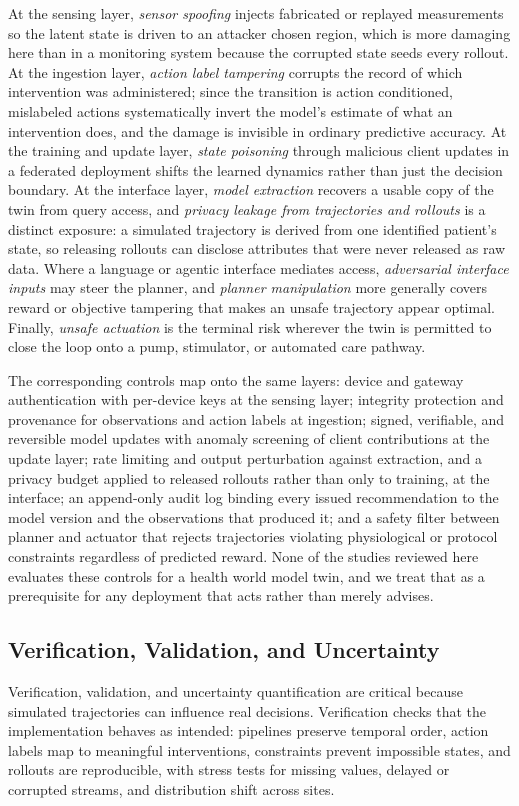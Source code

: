 \documentclass[journal]{IEEEtran}
\begin{document}
At the sensing layer, \emph{sensor spoofing} injects fabricated or replayed measurements so the latent state is driven to an attacker chosen region, which is more damaging here than in a monitoring system because the corrupted state seeds every rollout. At the ingestion layer, \emph{action label tampering} corrupts the record of which intervention was administered; since the transition is action conditioned, mislabeled actions systematically invert the model's estimate of what an intervention does, and the damage is invisible in ordinary predictive accuracy. At the training and update layer, \emph{state poisoning} through malicious client updates in a federated deployment shifts the learned dynamics rather than just the decision boundary. At the interface layer, \emph{model extraction} recovers a usable copy of the twin from query access, and \emph{privacy leakage from trajectories and rollouts} is a distinct exposure: a simulated trajectory is derived from one identified patient's state, so releasing rollouts can disclose attributes that were never released as raw data. Where a language or agentic interface mediates access, \emph{adversarial interface inputs} may steer the planner, and \emph{planner manipulation} more generally covers reward or objective tampering that makes an unsafe trajectory appear optimal. Finally, \emph{unsafe actuation} is the terminal risk wherever the twin is permitted to close the loop onto a pump, stimulator, or automated care pathway.

The corresponding controls map onto the same layers: device and gateway authentication with per-device keys at the sensing layer; integrity protection and provenance for observations and action labels at ingestion; signed, verifiable, and reversible model updates with anomaly screening of client contributions at the update layer; rate limiting and output perturbation against extraction, and a privacy budget applied to released rollouts rather than only to training, at the interface; an append-only audit log binding every issued recommendation to the model version and the observations that produced it; and a safety filter between planner and actuator that rejects trajectories violating physiological or protocol constraints regardless of predicted reward. None of the studies reviewed here evaluates these controls for a health world model twin, and we treat that as a prerequisite for any deployment that acts rather than merely advises.

\subsection{Verification, Validation, and Uncertainty}
Verification, validation, and uncertainty quantification are critical because simulated trajectories can influence real decisions. Verification checks that the implementation behaves as intended: pipelines preserve temporal order, action labels map to meaningful interventions, constraints prevent impossible states, and rollouts are reproducible, with stress tests for missing values, delayed or corrupted streams, and distribution shift across sites.
\end{document}
